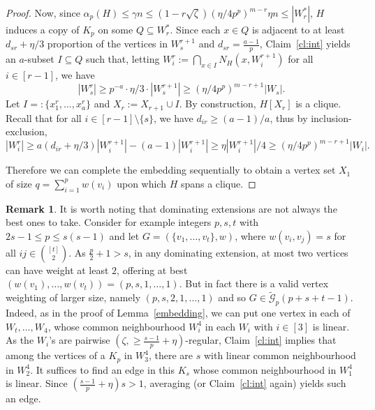 \documentclass[11pt, a4paper]{article}
\theoremstyle{definition}
\newtheorem{remark}[theorem]{Remark}
\newcommand{\cG}{\mathcal{G}}
\begin{document}
\begin{proof}
	Now, since $\alpha_p(H) \leq \gamma n \leq (1-r\sqrt{\zeta})(\eta/4p^p)^{m-r}\eta n \leq |W^*_r|$, $H$ induces a copy of $K_{p}$ on some $Q\subseteq W_r^*$. Since each $x\in Q$ is adjacent to at least $d_{sr}+\eta/3$ proportion of the vertices in $W_s^{r+1}$ and $d_{sr}=\frac{a-1}{p}$, Claim~\ref{cl:int} yields an $a$-subset $I\subseteq Q$ such that, letting $W_i^r := \bigcap_{x \in I}N_H(x,W_i^{r+1})$ for all $i \in [r-1]$, we have 
	$$|W_s^r| \geq p^{-a}\cdot\eta/3\cdot|W_s^{r+1}| \geq (\eta/4p^p)^{m-r+1}|W_s|.$$
	Let $I =: \lbrace x^r_1,\ldots,x^r_{a}\rbrace$ and $X_r := X_{r+1}\cup I$.
	By construction, $H[X_r]$ is a clique.
	Recall that for all $i \in [r-1]\setminus\lbrace s\rbrace$, we have $d_{ir} \geq (a-1)/a$,
	thus by inclusion-exclusion, 
	$$|W_i^r| \geq a(d_{ir}+\eta/3)|W_i^{r+1}| - (a-1)|W_i^{r+1}| \geq \eta|W_i^{r+1}|/4 \geq (\eta/4p^p)^{m-r+1}|W_i|.$$
	
	Therefore we can complete the embedding sequentially to obtain a vertex set $X_1$ of size $q=\sum_{i=1}^{p}w(v_i)$ upon which $H$ spans a clique.
\end{proof}


\begin{remark}
	It is worth noting that dominating extensions are not always the best ones to take. %
	Consider for example integers $p,s,t$ with $2s-1\le p \leq s(s-1)$ and let $G=(\lbrace v_1,\ldots,v_t\rbrace,w)$, where $w(v_i,v_j)=s$ for all $ij\in{[t]\choose 2}$. As $\frac{p}{2}+1>s$, in any dominating extension, at most two vertices can have weight at least $2$, offering at best $(w(v_1),\ldots,w(v_t)) =(p,s,1,\ldots,1)$. But in fact there is a valid vertex weighting of larger size, namely $(p,s,2,1,\ldots,1)$ and so $G\in \widetilde{\cG}_p(p+s+t-1)$. Indeed, as in the proof of Lemma~\ref{embedding}, we can put one vertex in each of $W_t,\ldots,W_4$, whose common neighbourhood $W_i^4$ in each $W_i$ with $i \in [3]$ is linear. 
	As the $W_i$'s are pairwise $(\zeta,\geq\!\frac{s-1}{p}+\eta)$-regular, Claim~\ref{cl:int} implies that among the vertices of a $K_{p}$ in $W_3^4$, there are $s$ with linear common neighbourhood in $W_2^4$. It suffices to find an edge in this $K_s$ whose common neighbourhood in $W_1^4$ is linear. Since $(\frac{s-1}{p}+\eta)s>1$, averaging (or Claim~\ref{cl:int} again) yields such an edge.
\end{remark}
\end{document}
